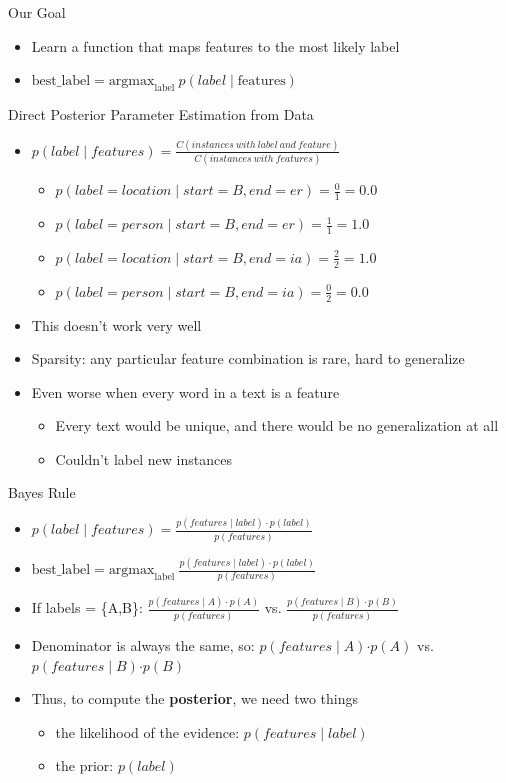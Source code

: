 \documentclass[11pt,letterpaper]{article}
\begin{document}
Our Goal

\begin{itemize}
  \item Learn a function that maps features to the most likely label  
  \item $\text{best\_label} = \text{argmax}_{\text{label}}~p(label \mid \text{features})$
\end{itemize}


Direct Posterior Parameter Estimation from Data

\begin{itemize}
  \item $p(label \mid features) = \frac{C(instances~with~label~and~feature)}{C(instances~with~features)}$
    \begin{itemize}
      \item $p(label=location \mid start=B, end=er) = \frac{0}{1} = 0.0$
      \item $p(label=person \mid start=B, end=er) = \frac{1}{1} = 1.0$
      \\
      \item $p(label=location \mid start=B, end=ia) = \frac{2}{2} = 1.0$
      \item $p(label=person \mid start=B, end=ia) = \frac{0}{2} = 0.0$
    \end{itemize}
  \item This doesn't work very well
  \item Sparsity: any particular feature combination is rare, hard to generalize
  \item Even worse when every word in a text is a feature
    \begin{itemize}
      \item Every text would be unique, and there would be no generalization at all
      \item Couldn't label new instances
    \end{itemize}
\end{itemize}


Bayes Rule

\begin{itemize}
  \item $p(label \mid features) = \frac{p(features \mid label) \cdot p(label)}{p(features)}$
  \item $\text{best\_label} = \text{argmax}_{\text{label}}~\frac{p(features \mid label) \cdot p(label)}{p(features)}$
  \item If labels = \{A,B\}: $\frac{p(features \mid A) \cdot p(A)}{p(features)}$ vs. $\frac{p(features \mid B) \cdot p(B)}{p(features)}$
  \item Denominator is always the same, so: $p(features \mid A)$$\cdot$$p(A)$ vs. $p(features \mid B)$$\cdot$$p(B)$
  \item Thus, to compute the \textbf{posterior}, we need two things
    \begin{itemize}
      \item the likelihood of the evidence: $p(features \mid label)$
      \item the prior: $p(label)$
    \end{itemize}
\end{itemize}
\end{document}
